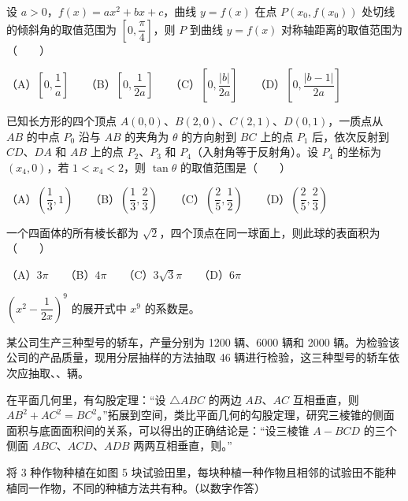 \begin{question}
设 $a>0$，$f(x)=ax^2+bx+c$，曲线 $y=f(x)$ 在点 $P(x_0,f(x_0))$ 处切线的倾斜角的取值范围为 $\left[0,\dfrac\pi4\right]$，则 $P$ 到曲线 $y=f(x)$ 对称轴距离的取值范围为\mbox{（　　）}

（A）$\left[0,\dfrac1a\right]$　　（B）$\left[0,\dfrac1{2a}\right]$　　（C）$\left[0,\dfrac{|b|}{2a}\right]$　　（D）$\left[0,\dfrac{|b-1|}{2a}\right]$

\end{question}
\begin{question}
已知长方形的四个顶点 $A(0,0)\text{、}B(2,0)\text{、}C(2,1)\text{、}D(0,1)$，一质点从 $AB$ 的中点 $P_0$ 沿与 $AB$ 的夹角为 $\theta$ 的方向射到 $BC$ 上的点 $P_1$ 后，依次反射到 $CD\text{、}DA$ 和 $AB$ 上的点 $P_2\text{、}P_3$ 和 $P_4$（入射角等于反射角）。设 $P_4$ 的坐标为 $(x_4,0)$，若 $1<x_4<2$，则 $\tan\theta$ 的取值范围是\mbox{（　　）}

（A）$\left(\dfrac13,1\right)$　　（B）$\left(\dfrac13,\dfrac23\right)$　　（C）$\left(\dfrac25,\dfrac12\right)$　　（D）$\left(\dfrac25,\dfrac23\right)$

\end{question}
\begin{question}
一个四面体的所有棱长都为 $\sqrt2$，四个顶点在同一球面上，则此球的表面积为\mbox{（　　）}

（A）$3\pi$　　（B）$4\pi$　　（C）$3\sqrt3\pi$　　（D）$6\pi$

\end{question}

\begin{question}
$\left(x^2-\dfrac1{2x}\right)^9$ 的展开式中 $x^9$ 的系数是\gkblank{}。

\end{question}
\begin{question}
某公司生产三种型号的轿车，产量分别为 1200 辆、6000 辆和 2000 辆。为检验该公司的产品质量，现用分层抽样的方法抽取 46 辆进行检验，这三种型号的轿车依次应抽取\gkblank{}、\gkblank{}、\gkblank{}辆。

\end{question}
\begin{question}
在平面几何里，有勾股定理：“设 $\triangle ABC$ 的两边 $AB\text{、}AC$ 互相垂直，则 $AB^2+AC^2=BC^2$。”拓展到空间，类比平面几何的勾股定理，研究三棱锥的侧面面积与底面面积间的关系，可以得出的正确结论是：“设三棱锥 $A-BCD$ 的三个侧面 $ABC\text{、}ACD\text{、}ADB$ 两两互相垂直，则\gkblank{}。”

\Needspace{0.4\textheight}
\end{question}
\begin{question}
将 3 种作物种植在如图 5 块试验田里，每块种植一种作物且相邻的试验田不能种植同一作物，不同的种植方法共有\gkblank{}种。（以数字作答）
\nopagebreak[4]
\begin{center}\end{center}
\nopagebreak[4]
\end{question}

